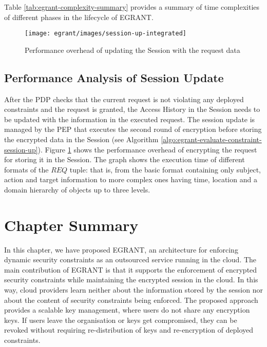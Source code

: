 \documentclass[epsfig,a4paper,11pt,titlepage]{book}
\numberwithin{algorithm}{chapter}
\begin{document}
Table \ref{tab:egrant-complexity-summary} provides a summary of time complexities of different phases in the lifecycle of \gls{EGRANT}.



\begin{figure} [htp]
\centering
\texttt{[image: egrant/images/session-up-integrated]}
\caption{Performance overhead of updating the Session with the request data}
\label{fig:egrant-session-up-integrated}
\end{figure}

\subsection{Performance Analysis of Session Update}
After the \gls{PDP} checks that the current request is not violating any deployed constraints and the request is granted, the Access History in the Session needs to be updated with the information in the executed request. The session update is managed by the \gls{PEP} that executes the second round of encryption before storing the encrypted data in the Session (see Algorithm \ref{algo:egrant-evaluate-constraint-session-up}). Figure \ref{fig:egrant-session-up-integrated} shows the performance overhead of encrypting the request for storing it in the Session. The graph shows the execution time of different formats of the $\mathit{REQ}$ tuple: that is, from the basic format containing only subject, action and target information to more complex ones having time, location and a domain hierarchy of objects up to three levels.


\section{Chapter Summary}
\label{sec:egrant-summary}

In this chapter, we have proposed \gls{EGRANT}, an architecture for enforcing dynamic security constraints as an outsourced service running in the cloud. The main contribution of \gls{EGRANT} is that it supports the enforcement of encrypted security constraints while maintaining the encrypted session in the cloud. In this way, cloud providers learn neither about the information stored by the session nor about the content of security constraints being enforced. The proposed approach provides a scalable key management, where users do not share any encryption keys. If users leave the organisation or keys get compromised, they can be revoked without requiring re-distribution of keys and re-encryption of deployed constraints.
\end{document}

